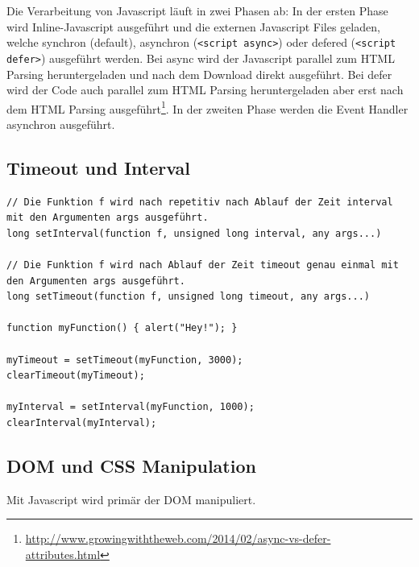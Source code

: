 Die Verarbeitung von Javascript läuft in zwei Phasen ab: In der ersten Phase wird Inline-Javascript ausgeführt und die externen Javascript Files geladen, welche synchron (default), asynchron (\lstinline|<script async>|) oder defered (\lstinline|<script defer>|) ausgeführt werden. Bei async wird der Javascript parallel zum HTML Parsing heruntergeladen und nach dem Download direkt ausgeführt. Bei defer wird der Code auch parallel zum HTML Parsing heruntergeladen aber erst nach dem HTML Parsing ausgeführt\footnote{\url{http://www.growingwiththeweb.com/2014/02/async-vs-defer-attributes.html}}. In der zweiten Phase werden die Event Handler asynchron ausgeführt. 

\subsection{Timeout und Interval}
\begin{lstlisting}[label=lst:timeout-interval,caption=Timeout \& Interval]
// Die Funktion f wird nach repetitiv nach Ablauf der Zeit interval mit den Argumenten args ausgeführt.
long setInterval(function f, unsigned long interval, any args...)

// Die Funktion f wird nach Ablauf der Zeit timeout genau einmal mit den Argumenten args ausgeführt.
long setTimeout(function f, unsigned long timeout, any args...)

function myFunction() { alert("Hey!"); }

myTimeout = setTimeout(myFunction, 3000);
clearTimeout(myTimeout);

myInterval = setInterval(myFunction, 1000);
clearInterval(myInterval);
\end{lstlisting}

\newpage

\subsection{DOM und CSS Manipulation}
Mit Javascript wird primär der DOM manipuliert. 

